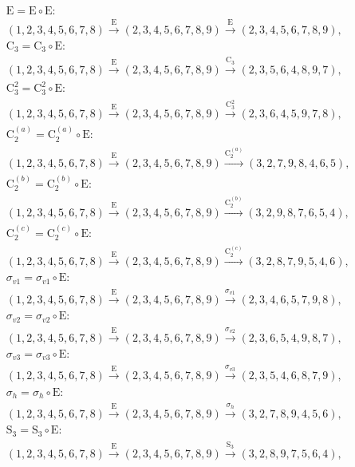 \begin{align*}
& \mathrm{E} = \mathrm{E} \circ \mathrm{E}:\; \\& (1,2,3,4,5,6,7,8) \xrightarrow{\mathrm{E}} (2,3,4,5,6,7,8,9) \xrightarrow{\mathrm{E}} (2,3,4,5,6,7,8,9), \\
& \mathrm{C}_{3} = \mathrm{C}_{3} \circ \mathrm{E}:\; \\& (1,2,3,4,5,6,7,8) \xrightarrow{\mathrm{E}} (2,3,4,5,6,7,8,9) \xrightarrow{\mathrm{C}_{3}} (2,3,5,6,4,8,9,7), \\
& \mathrm{C}_{3}^{2} = \mathrm{C}_{3}^{2} \circ \mathrm{E}:\; \\& (1,2,3,4,5,6,7,8) \xrightarrow{\mathrm{E}} (2,3,4,5,6,7,8,9) \xrightarrow{\mathrm{C}_{3}^{2}} (2,3,6,4,5,9,7,8), \\
& \mathrm{C}_{2}^{(a)} = \mathrm{C}_{2}^{(a)} \circ \mathrm{E}:\; \\& (1,2,3,4,5,6,7,8) \xrightarrow{\mathrm{E}} (2,3,4,5,6,7,8,9) \xrightarrow{\mathrm{C}_{2}^{(a)}} (3,2,7,9,8,4,6,5), \\
& \mathrm{C}_{2}^{(b)} = \mathrm{C}_{2}^{(b)} \circ \mathrm{E}:\; \\& (1,2,3,4,5,6,7,8) \xrightarrow{\mathrm{E}} (2,3,4,5,6,7,8,9) \xrightarrow{\mathrm{C}_{2}^{(b)}} (3,2,9,8,7,6,5,4), \\
& \mathrm{C}_{2}^{(c)} = \mathrm{C}_{2}^{(c)} \circ \mathrm{E}:\; \\& (1,2,3,4,5,6,7,8) \xrightarrow{\mathrm{E}} (2,3,4,5,6,7,8,9) \xrightarrow{\mathrm{C}_{2}^{(c)}} (3,2,8,7,9,5,4,6), \\
& \sigma_{v1} = \sigma_{v1} \circ \mathrm{E}:\; \\& (1,2,3,4,5,6,7,8) \xrightarrow{\mathrm{E}} (2,3,4,5,6,7,8,9) \xrightarrow{\sigma_{v1}} (2,3,4,6,5,7,9,8), \\
& \sigma_{v2} = \sigma_{v2} \circ \mathrm{E}:\; \\& (1,2,3,4,5,6,7,8) \xrightarrow{\mathrm{E}} (2,3,4,5,6,7,8,9) \xrightarrow{\sigma_{v2}} (2,3,6,5,4,9,8,7), \\
& \sigma_{v3} = \sigma_{v3} \circ \mathrm{E}:\; \\& (1,2,3,4,5,6,7,8) \xrightarrow{\mathrm{E}} (2,3,4,5,6,7,8,9) \xrightarrow{\sigma_{v3}} (2,3,5,4,6,8,7,9), \\
& \sigma_{h} = \sigma_{h} \circ \mathrm{E}:\; \\& (1,2,3,4,5,6,7,8) \xrightarrow{\mathrm{E}} (2,3,4,5,6,7,8,9) \xrightarrow{\sigma_{h}} (3,2,7,8,9,4,5,6), \\
& \mathrm{S}_{3} = \mathrm{S}_{3} \circ \mathrm{E}:\; \\& (1,2,3,4,5,6,7,8) \xrightarrow{\mathrm{E}} (2,3,4,5,6,7,8,9) \xrightarrow{\mathrm{S}_{3}} (3,2,8,9,7,5,6,4), \\

\end{align*}
